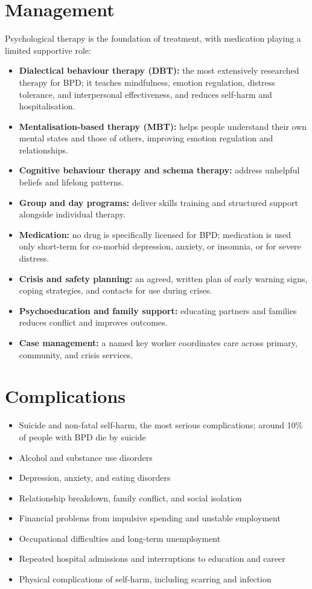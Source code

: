 \section*{Management}
Psychological therapy is the foundation of treatment, with medication playing a limited supportive role:
\begin{itemize}
    \item \textbf{Dialectical behaviour therapy (DBT):} the most extensively researched therapy for BPD; it teaches mindfulness, emotion regulation, distress tolerance, and interpersonal effectiveness, and reduces self-harm and hospitalisation.
    \item \textbf{Mentalisation-based therapy (MBT):} helps people understand their own mental states and those of others, improving emotion regulation and relationships.
    \item \textbf{Cognitive behaviour therapy and schema therapy:} address unhelpful beliefs and lifelong patterns.
    \item \textbf{Group and day programs:} deliver skills training and structured support alongside individual therapy.
    \item \textbf{Medication:} no drug is specifically licensed for BPD; medication is used only short-term for co-morbid depression, anxiety, or insomnia, or for severe distress.
    \item \textbf{Crisis and safety planning:} an agreed, written plan of early warning signs, coping strategies, and contacts for use during crises.
    \item \textbf{Psychoeducation and family support:} educating partners and families reduces conflict and improves outcomes.
    \item \textbf{Case management:} a named key worker coordinates care across primary, community, and crisis services.
\end{itemize}

\section*{Complications}
\begin{itemize}
    \item Suicide and non-fatal self-harm, the most serious complications; around 10\% of people with BPD die by suicide
    \item Alcohol and substance use disorders
    \item Depression, anxiety, and eating disorders
    \item Relationship breakdown, family conflict, and social isolation
    \item Financial problems from impulsive spending and unstable employment
    \item Occupational difficulties and long-term unemployment
    \item Repeated hospital admissions and interruptions to education and career
    \item Physical complications of self-harm, including scarring and infection
\end{itemize}


